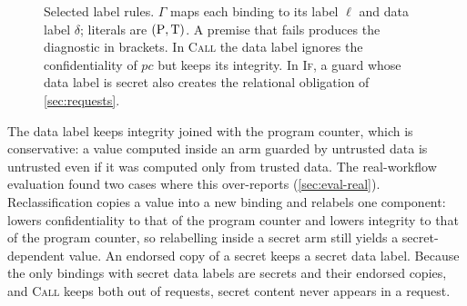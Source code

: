 \begin{figure}[t]
\centering\footnotesize
{}
\caption{Selected label rules. $\Gamma$ maps each binding to its label $\ell$ and data label
$\delta$; literals are $(\mathrm{P},\mathrm{T})$. A premise that fails produces the diagnostic in brackets.
In \textsc{Call} the data label ignores the confidentiality of $pc$ but keeps its integrity. In
\textsc{If}, a guard whose data label is secret also creates the relational obligation of
\cref{sec:requests}.}
\label{fig:rules}
\end{figure}

The data label keeps integrity joined with the program counter, which is
conservative: a value computed inside an arm guarded by untrusted data is untrusted
even if it was computed only from trusted data. The real-workflow evaluation found
two cases where this over-reports (\cref{sec:eval-real}). Reclassification copies a
value into a new binding and relabels one component:  lowers
confidentiality to that of the program counter and  lowers integrity
to that of the program counter, so relabelling inside a secret arm still yields a
secret-dependent value. An endorsed copy of a secret keeps a secret data label.
Because the only bindings with secret data labels are secrets and their endorsed
copies, and \textsc{Call} keeps both out of requests, secret content never appears
in a request.

